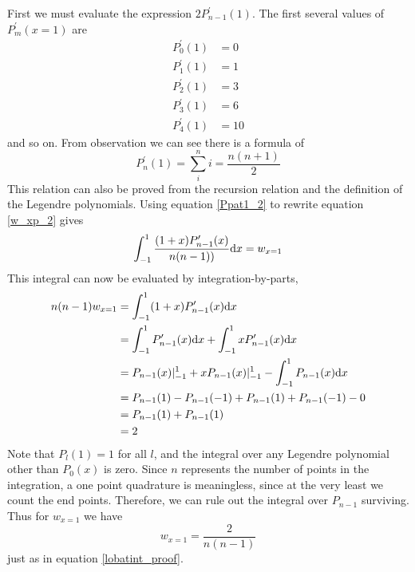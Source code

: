 \documentclass[preprint]{revtex4}
\newcommand{\dx}{{\rm d}x}
\newcommand{\intunit}{\ensuremath{\int_{-1}^{1}}}
\begin{document}
First we must evaluate the expression $2P^\prime_{n-1}(1)$. The first several values
of $P^\prime_m(x=1)$ are
\begin{align}
\label{Ppat1}
P^\prime_0(1) &=0 \nonumber \\
P^\prime_1(1) &=1 \nonumber \\
P^\prime_2(1) &=3 \nonumber \\
P^\prime_3(1) &=6 \nonumber \\
P^\prime_4(1) &=10
\end{align}
and so on. From observation we can see there is a formula of 
\begin{equation}
\label{Ppat1_2}
P^\prime_n(1)=\sum_i^ni = \frac{n(n+1)}{2}
\end{equation}
This relation can also be proved from the recursion relation and the definition
of the Legendre polynomials. Using equation \ref{Ppat1_2} to rewrite equation 
\ref{w_xp_2} gives
\begin{equation}
\label{w_xp_3}
\intunit \frac{(1+x)P^\prime_{n-1}(x)}{n(n-1))}\dx = w_{x=1}
\end{equation}
This integral can now be evaluated by integration-by-parts, 
\begin{align}
n(n-1)w_{x=1} &= \intunit (1+x)P^\prime_{n-1}(x)\dx \nonumber\\
&= \intunit P^\prime_{n-1}(x)\dx + \intunit xP^\prime_{n-1}(x)\dx \nonumber \\
&= P_{n-1}(x)\vert^1_{-1} + xP_{n-1}(x) \vert^1_{-1} - \intunit P_{n-1}(x)\dx \nonumber \\
&= P_{n-1}(1)-P_{n-1}(-1)+P_{n-1}(1)+P_{n-1}(-1) - 0 \nonumber \\
&= P_{n-1}(1)+P_{n-1}(1)\nonumber \\
\label{xp_int}
&=2
\end{align}
Note that $P_l(1)=1$ for all $l$, and the integral over any Legendre polynomial
other than $P_0(x)$ is zero. Since $n$ represents the number of points in the integration,
a one point quadrature is meaningless, since at the very least we count the end points.  
Therefore, we can rule out the integral over $P_{n-1}$ 
surviving. Thus for $w_{x=1}$ we have
\begin{equation}
w_{x=1}=\frac{2}{n(n-1)}
\end{equation}
just as in equation \ref{lobatint_proof}. 
\end{document}
